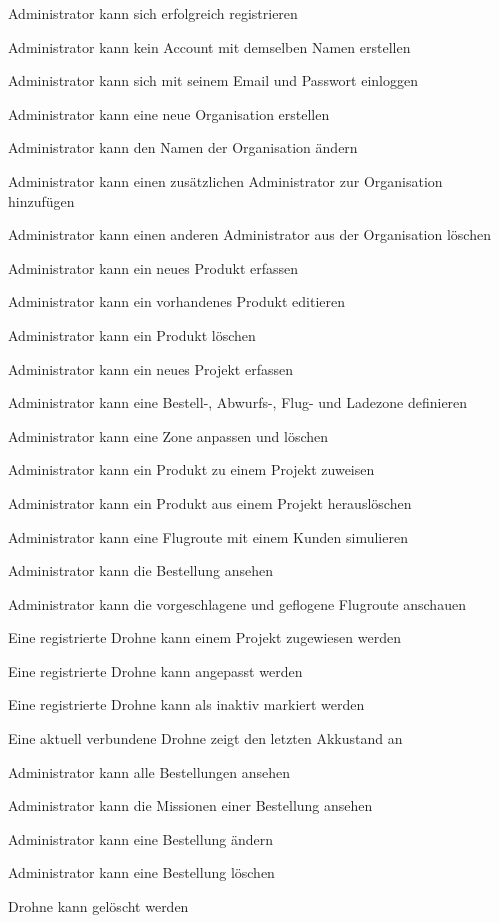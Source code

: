\begin{todolist}
	\item[\done] Administrator kann sich erfolgreich registrieren
	\item[\done] Administrator kann kein Account mit demselben Namen erstellen
	\item[\done] Administrator kann sich mit seinem Email und Passwort einloggen
	\item[\done] Administrator kann eine neue Organisation erstellen
	\item[\done] Administrator kann den Namen der Organisation ändern
	\item[\done] Administrator kann einen zusätzlichen Administrator zur Organisation hinzufügen
	\item[\done] Administrator kann einen anderen Administrator aus der Organisation  löschen
	\item[\done] Administrator kann ein neues Produkt erfassen
	\item[\done] Administrator kann ein vorhandenes Produkt editieren
	\item[\done] Administrator kann ein Produkt löschen
	\item[\done] Administrator kann ein neues Projekt erfassen
	\item[\done] Administrator kann eine Bestell-, Abwurfs-, Flug- und Ladezone definieren
	\item[\done] Administrator kann eine Zone anpassen und löschen
	\item[\done] Administrator kann ein Produkt zu einem Projekt zuweisen
	\item[\done] Administrator kann ein Produkt aus einem Projekt herauslöschen
	\item[\done] Administrator kann eine Flugroute mit einem Kunden simulieren

	\item[\done] Administrator kann die Bestellung ansehen
	\item[\done] Administrator kann die vorgeschlagene und geflogene Flugroute anschauen

	\item[\done] Eine registrierte Drohne kann einem Projekt zugewiesen werden
	\item[\done] Eine registrierte Drohne kann angepasst werden
	\item[\done] Eine registrierte Drohne kann als inaktiv markiert werden
	\item[\done] Eine aktuell verbundene Drohne zeigt den letzten Akkustand an
	\item[\done] Administrator kann alle Bestellungen ansehen
	\item[\done] Administrator kann die Missionen einer Bestellung ansehen

	\item Administrator kann eine Bestellung ändern 
	\item Administrator kann eine Bestellung löschen 
	\item Drohne kann gelöscht werden 


\end{todolist}

